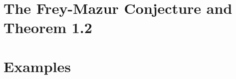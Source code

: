 \documentclass[12pt]{amsart}
\theoremstyle{definition}
\begin{document}
\vspace{100pt}

\section{The Frey-Mazur Conjecture and Theorem 1.2}


\section{Examples}



















{}

\end{document}
